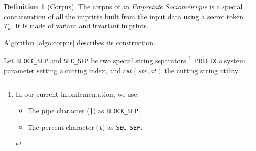 \documentclass[twoside,twocolumn]{article}
\theoremstyle{definition}
\newtheorem{definition}{Definition}
\theoremstyle{remark}
\begin{document}
\begin{definition}[Corpus]
    \label{corpus}
    The corpus of an \emph{Empreinte Sociométrique} is a special concatenation of all the imprints built from the input data using a secret token $T_k$.
    It is made of variant and invariant imprints.

    Algorithm \ref{algo:corpus} describes its construction.

    Let \texttt{BLOCK\_SEP} and \texttt{SEC\_SEP} be two special string separators \footnote{In our current impmlementation, we use:
        \begin{itemize}
            \item The pipe character (\texttt{|}) as \texttt{BLOCK\_SEP};
            \item The percent character (\texttt{\%}) as \texttt{SEC\_SEP}.
        \end{itemize}
    }, \texttt{PREFIX} a system parameter setting a cutting index, and $cut(str, at)$ the cutting string utility.


\end{definition}
\end{document}
